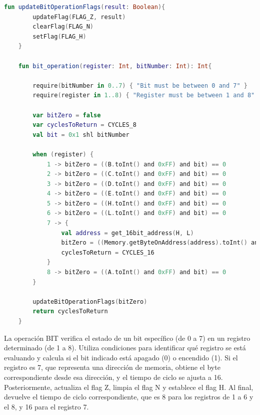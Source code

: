 \begin{lstlisting}[language=Kotlin, caption={Operación BIT}, label={code:kotlinbit}]
    fun updateBitOperationFlags(result: Boolean){
        updateFlag(FLAG_Z, result)
        clearFlag(FLAG_N)
        setFlag(FLAG_H)
    }

    fun bit_operation(register: Int, bitNumber: Int): Int{

        require(bitNumber in 0..7) { "Bit must be between 0 and 7" }
        require(register in 1..8) { "Register must be between 1 and 8" }

        var bitZero = false
        var cyclesToReturn = CYCLES_8
        val bit = 0x1 shl bitNumber

        when (register) {
            1 -> bitZero = ((B.toInt() and 0xFF) and bit) == 0
            2 -> bitZero = ((C.toInt() and 0xFF) and bit) == 0
            3 -> bitZero = ((D.toInt() and 0xFF) and bit) == 0
            4 -> bitZero = ((E.toInt() and 0xFF) and bit) == 0
            5 -> bitZero = ((H.toInt() and 0xFF) and bit) == 0
            6 -> bitZero = ((L.toInt() and 0xFF) and bit) == 0
            7 -> {
                val address = get_16bit_address(H, L)
                bitZero = ((Memory.getByteOnAddress(address).toInt() and 0xFF) and bit) == 0
                cyclesToReturn = CYCLES_16
            }
            8 -> bitZero = ((A.toInt() and 0xFF) and bit) == 0
        }

        updateBitOperationFlags(bitZero)
        return cyclesToReturn
    }
\end{lstlisting}

La operación BIT verifica el estado de un bit específico (de 0 a 7) en un registro determinado (de 1 a 8). Utiliza condiciones para identificar qué registro se está evaluando y calcula si el bit indicado está apagado (0) o encendido (1). Si el registro es 7, que representa una dirección de memoria, obtiene el byte correspondiente desde esa dirección, y el tiempo de ciclo se ajusta a 16. Posteriormente, actualiza el flag Z, limpia el flag N y establece el flag H. Al final, devuelve el tiempo de ciclo correspondiente, que es 8 para los registros de 1 a 6 y el 8, y 16 para el registro 7.

